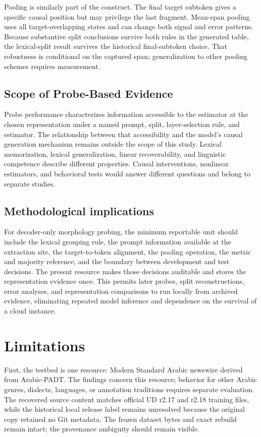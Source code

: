 \documentclass[pdflatex,sn-basic]{sn-jnl}
\begin{document}
Pooling is similarly part of the construct. The final target subtoken gives a
specific causal position but may privilege the last fragment. Mean-span
pooling uses all target-overlapping states and can change both signal and
error patterns. Because substantive split conclusions survive both rules in
the generated table, the lexical-split result survives the historical
final-subtoken choice. That robustness is conditional on the captured span;
generalization to other pooling schemes requires measurement.

\subsection{Scope of Probe-Based Evidence}

Probe performance characterizes information accessible to the estimator at the
chosen representation under a named prompt, split, layer-selection rule, and
estimator. The relationship between that accessibility and the model's causal
generation mechanism remains outside the scope of this study. Lexical
memorization, lexical generalization, linear recoverability, and linguistic
competence describe different properties. Causal interventions, nonlinear
estimators, and behavioral tests would answer different questions and belong
to separate studies.

\subsection{Methodological implications}

For decoder-only morphology probing, the minimum reportable unit should
include the lexical grouping rule, the prompt information available at the
extraction site, the target-to-token alignment, the pooling operation, the
metric and majority reference, and the boundary between development and test
decisions. The present resource makes those decisions auditable and stores the
representation evidence once. This permits later probes, split
reconstructions, error analyses, and representation comparisons to run locally
from archived evidence, eliminating repeated model inference and dependence on
the survival of a cloud instance.

\section{Limitations}

First, the testbed is one resource: Modern Standard Arabic newswire derived
from Arabic-PADT. The findings concern this resource; behavior for other
Arabic genres, dialects, languages, or annotation traditions requires separate
evaluation. The recovered source content
matches official UD r2.17 and r2.18 training files, while the historical local
release label remains unresolved because the original copy retained no Git
metadata. The frozen dataset bytes and exact rebuild remain intact; the
provenance ambiguity should remain visible.
\end{document}
